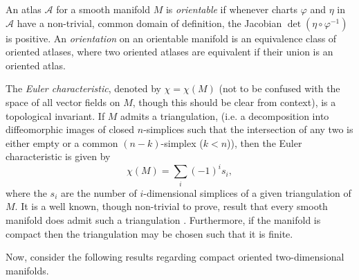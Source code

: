 \begin{definition}
An atlas $\mathcal{A}$ for a smooth manifold $M$ is \textit{orientable} if whenever charts $\varphi$ and $\eta$ in $\mathcal{A}$ have a non-trivial, common domain of definition, the Jacobian $\det(\eta\circ\varphi^{-1})$ is positive. An \textit{orientation} on an orientable manifold is an equivalence class of oriented atlases, where two oriented atlases are equivalent if their union is an oriented atlas.
\end{definition}
\begin{definition}
The \textit{Euler characteristic}, denoted by $\chi=\chi(M)$ (not to be confused with the space of all vector fields on $M$, though this should be clear from context), is a topological invariant. If $M$ admits a triangulation, (i.e. a decomposition into diffeomorphic images of closed $n$-simplices such that the intersection of any two is either empty or a common $(n-k)$-simplex ($k<n$)), then the Euler characteristic is given by
\[
\chi(M)=\sum_i(-1)^is_i,
\] 
where the $s_i$ are the number of $i$-dimensional simplices of a given triangulation of $M$.
It is a well known, though non-trivial to prove, result that every smooth manifold does admit such a triangulation \cite{whitehead1940c1}. Furthermore, if the manifold is compact then the triangulation may be chosen such that it is finite.
\end{definition}

Now, consider the following results regarding compact oriented two-dimensional manifolds.

